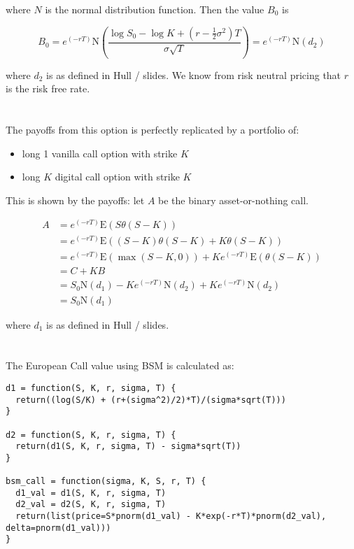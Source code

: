 \documentclass[11pt]{scrartcl}
\newcommand{\epower}[1]{\ensuremath{e^{\left(#1\right)}}}
\newcommand{\expectation}[1]{\ensuremath{\mathrm{E}{\left(#1\right)}}}
\begin{document}
where $N$ is the normal distribution function. Then the value $B_0$ is

\[B_0 = \epower{-rT} \mathrm{N}\left(\frac{\log{S_0} - \log{K} + \left(r - \frac{1}{2}\sigma^2\right)T}{\sigma \sqrt{T}}\right) = \epower{-rT} \mathrm{N}(d_2)\]

where $d_2$ is as defined in Hull / slides. We know from risk neutral pricing that $r$ is the risk free rate.

\section{}

The payoffs from this option is perfectly replicated by a portfolio of:

\begin{itemize}
\item long 1 vanilla call option with strike $K$
\item long $K$ digital call option with strike $K$
\end{itemize}

This is shown by the payoffs: let $A$ be the binary asset-or-nothing call.

\begin{align*}
A &= \epower{-rT}\expectation{S\theta(S-K)} \\
&= \epower{-rT}\expectation{(S-K)\theta(S-K) + K\theta(S-K)} \\
&= \epower{-rT}\expectation{\max{(S-K, 0)}} + K\epower{-rT}\expectation{\theta(S-K)} \\
&= C + KB \\
&= S_0 \mathrm{N}(d_1) - K\epower{-rT}\mathrm{N}(d_2) + K\epower{-rT}\mathrm{N}(d_2) \\
&= S_0 \mathrm{N}(d_1)
\end{align*}

where $d_1$ is as defined in Hull / slides.

\section{}

The European Call value using BSM is calculated as:

\begin{lstlisting}
d1 = function(S, K, r, sigma, T) {
  return((log(S/K) + (r+(sigma^2)/2)*T)/(sigma*sqrt(T)))
}

d2 = function(S, K, r, sigma, T) {
  return(d1(S, K, r, sigma, T) - sigma*sqrt(T))
}

bsm_call = function(sigma, K, S, r, T) {
  d1_val = d1(S, K, r, sigma, T)
  d2_val = d2(S, K, r, sigma, T)
  return(list(price=S*pnorm(d1_val) - K*exp(-r*T)*pnorm(d2_val), delta=pnorm(d1_val)))
}
\end{lstlisting}
\end{document}
